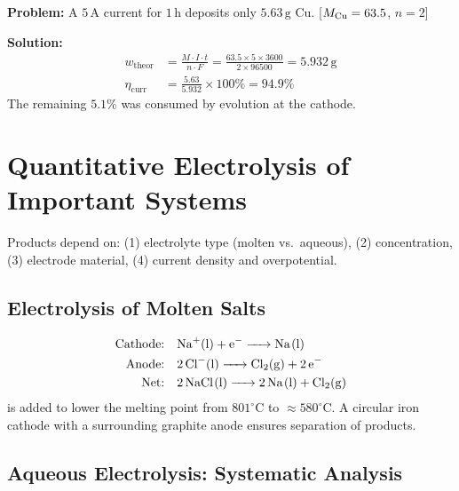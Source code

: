 \begin{examplebox}
\textbf{Problem:} A $5\,\text{A}$ current for $1\,\text{h}$ deposits only $5.63\,\text{g}$ Cu.
[$M_{\ce{Cu}} = 63.5$, $n=2$]

\textbf{Solution:}
\begin{align*}
w_{\text{theor}} &= \frac{M\cdot I\cdot t}{n\cdot F} = \frac{63.5 \times 5 \times 3600}{2 \times 96500} = 5.932\,\text{g}\\
\eta_{\text{curr}} &= \frac{5.63}{5.932}\times 100\% = \mathbf{94.9\%}
\end{align*}
The remaining $5.1\%$ was consumed by  evolution at the cathode.
\end{examplebox}

\section{Quantitative Electrolysis of Important Systems}

Products depend on: (1) electrolyte type (molten vs.\ aqueous), (2) concentration, (3) electrode material, (4) current density and overpotential.

\subsection{Electrolysis of Molten Salts}

\begin{examplebox}
\begin{align*}
\text{Cathode:}& \quad \ce{Na+(l) + e- -> Na(l)}\\
\text{Anode:}& \quad \ce{2Cl-(l) -> Cl2(g) + 2e-}\\
\text{Net:}& \quad \ce{2NaCl(l) -> 2Na(l) + Cl2(g)}
\end{align*}
 is added to lower the melting point from $801^\circ\text{C}$ to $\approx580^\circ\text{C}$. A circular iron cathode with a surrounding graphite anode ensures separation of products.
\end{examplebox}

\subsection{Aqueous Electrolysis: Systematic Analysis}

